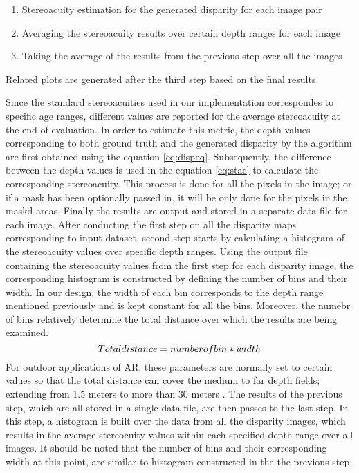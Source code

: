 \begin{enumerate}
\item Stereoacuity estimation for the generated disparity for each image pair
\item Averaging the stereoacuity results over certain depth ranges for each image
\item Taking the average of the results from the previous step over all the images
\end{enumerate}
Related plots are generated after the third step based on the final results.

Since the standard stereoacuities used in our implementation correspondes to specific age ranges, different values are reported for the average stereoacuity
at the end of evaluation. 
In order to estimate this metric, the depth values corresponding to both ground truth and the generated disparity by the algorithm are first
obtained using the equation \ref{eq:dispeq}. Subsequently, the difference between the depth values is used in the equation \ref{eq:stac} to calculate
the corresponding stereoacuity. This process is done for all the pixels in the image; or if a mask has been optionally passed in, 
it will be only done for the pixels in the maskd areas. Finally the results are output and stored in a separate data file for each image.
After conducting the first step on all the disparity maps corresponding to input dataset, second step starts by calculating a histogram of
the stereoacuity values over specific depth ranges. Using the output file containing the stereoacuity values 
from the first step for each disparity image, the corresponding histogram is constructed by defining the number of bins and their width.
In our design, the width of each bin corresponds to the depth range mentioned previously and is kept constant for all the bins.
Moreover, the numebr of bins relatively determine the total distance over which the results
are being examined.
\begin{equation}
\centering
Total distance = number of bin * width
\end{equation}
For outdoor applications of AR, these parameters are normally set to certain values so that the total distance can cover the medium to far 
depth fields; extending from 1.5 meters to more than 30 meters \cite{swa07}.
The results of the previous step, which are all stored in a single data file, are then passes to the last step. 
In this step, a histogram is built over the data from all the disparity images, which results in the average stereocuity
values within each specified depth range over all images. 
It should be noted that the number of bins and their corresponding width at this point, are
similar to histogram constructed in the the previous step.




